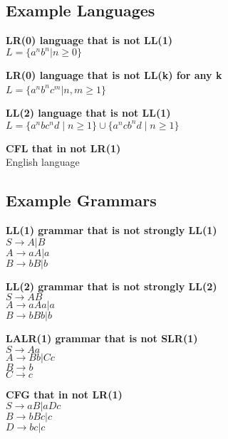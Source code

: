 \subsection{Example Languages}
\textbf{LR(0) language that is not LL(1)}\\
    $L = \{a^n b^n | n \geq 0\}$

\textbf{LR(0) language that is not LL(k) for any k}\\
$L = \{a^n b^n c^m | n, m \geq 1\} $\

\textbf{LL(2) language that is not LL(1)}\\
$L = \{ a^n b c^n d \mid n \geq 1 \} \cup \{ a^n c b^n d \mid n \geq 1 \}$

\textbf{CFL that in not LR(1)}\\
    English language

\subsection{Example Grammars}
\textbf{LL(1) grammar that is not strongly LL(1)}\\
    $S \rightarrow A | B$\\
    $A \rightarrow aA | a$\\
    $B \rightarrow bB | b$

\textbf{LL(2) grammar that is not strongly LL(2)}\\
    $S \rightarrow A B$\\
    $A \rightarrow a A a | a$\\
    $B \rightarrow b B b | b$

\textbf{LALR(1) grammar that is not SLR(1)}\\
    $S \rightarrow A a$\\
    $A \rightarrow B b | C c$\\
    $B \rightarrow b$\\
    $C \rightarrow c$

\textbf{CFG that in not LR(1)}\\
    $S\rightarrow aB|aDc$\\
    $B\rightarrow bBc|c$\\
    $D\rightarrow bc|c$
